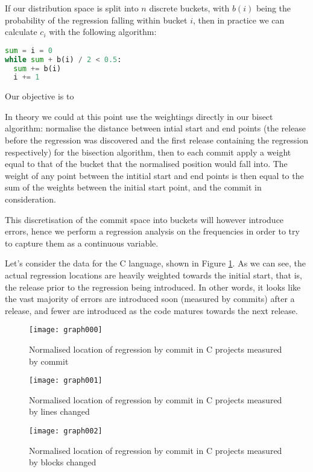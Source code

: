 \documentclass[10pt,journal,compsoc]{IEEEtran}
\begin{document}
If our distribution space is split into $n$ discrete buckets, with $b(i)$ being the probability of the regression falling within bucket $i$, then in practice we can calculate $c_i$ with the following algorithm:

\begin{lstlisting}[language=Python]
sum = i = 0
while sum + b(i) / 2 < 0.5:
  sum += b(i)
  i += 1
\end{lstlisting}

Our objective is to 

In theory we could at this point use the weightings directly in our bisect algorithm: normalise the distance between intial start and end points (the release before the regression was discovered and the first release containing the regression respectively) for the bisection algorithm, then to each commit apply a weight equal to that of the bucket that the normalised position would fall into. The weight of any point between the intitial start and end points is then equal to the sum of the weights between the initial start point, and the commit in consideration.

This discretisation of the commit space into buckets will however introduce errors, hence we perform a regression analysis on the frequencies in order to try to capture them as a continuous variable.

Let's consider the data for the C language, shown in Figure \ref{fig:c-commits}. As we can see, the actual regression locations are heavily weighted towards the initial start, that is, the release prior to the regression being introduced. In other words, it looks like the vast majority of errors are introduced soon (measured by commits) after a release, and fewer are introduced as the code matures towards the next release.

\begin{figure}[t]
\centering
\texttt{[image: graph000]}%
\caption{\label{fig:c-commits}Normalised location of regression by commit in C projects measured by commit}
\end{figure}

\begin{figure}[t]
\centering
\texttt{[image: graph001]}%
\caption{\label{fig:c-lines}Normalised location of regression by commit in C projects measured by lines changed}
\end{figure}

\begin{figure}[t]
\centering
\texttt{[image: graph002]}%
\caption{\label{fig:c-blocks}Normalised location of regression by commit in C projects measured by blocks changed}
\end{figure}
\end{document}
